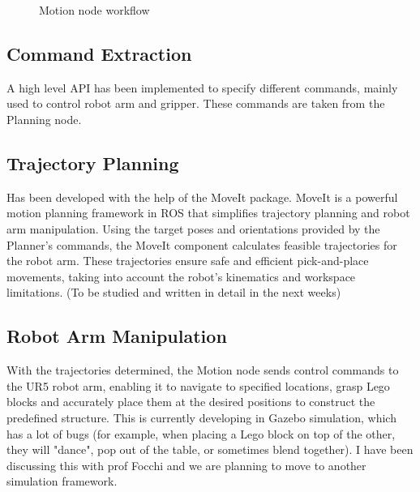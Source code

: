 \documentclass{article}
\begin{document}
	\begin{figure}[!ht]
		\centering
		\caption{Motion node workflow}
		\label{fig:design-motion}
	\end{figure}
	
	\subsection{Command Extraction}
	A high level API has been implemented to specify different commands, mainly used to control robot arm and gripper. These commands are taken from the Planning node.
	
	\subsection{Trajectory Planning}
	Has been developed with the help of the MoveIt package. MoveIt is a powerful motion planning framework in ROS that simplifies trajectory planning and robot arm manipulation. Using the target poses and orientations provided by the Planner's commands, the MoveIt component calculates feasible trajectories for the robot arm. These trajectories ensure safe and efficient pick-and-place movements, taking into account the robot's kinematics and workspace limitations. (To be studied and written in detail in the next weeks)
	
	\subsection{Robot Arm Manipulation}
	With the trajectories determined, the Motion node sends control commands to the UR5 robot arm, enabling it to navigate to specified locations, grasp Lego blocks and accurately place them at the desired positions to construct the predefined structure. This is currently developing in Gazebo simulation, which has a lot of bugs (for example, when placing a Lego block on top of the other, they will "dance", pop out of the table, or sometimes blend together). I have been discussing this with prof Focchi and we are planning to move to another simulation framework.
	
\end{document}
